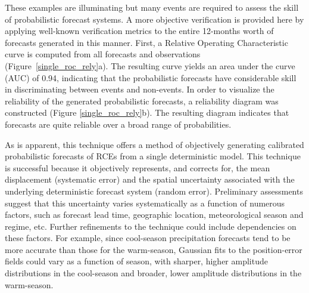 These examples are illuminating but many events are required to assess the skill of probabilistic forecast systems.
A more objective verification is provided here by applying well-known verification metrics to the entire 12-months worth of forecasts generated in this manner.
First, a Relative Operating Characteristic curve \citep{Mason1982} is computed from all forecasts and observations \mbox{(Figure \ref{single_roc_rely}a)}.
The resulting curve yields an area under the curve (AUC) of 0.94, indicating that the probabilistic forecasts have considerable skill in discriminating between events and non-events.
In order to visualize the reliability of the generated probabilistic forecasts, a reliability diagram was constructed (Figure \mbox{\ref{single_roc_rely}b)}.
The resulting diagram indicates that forecasts are quite reliable over a broad range of probabilities.


As is apparent, this technique offers a method of objectively generating calibrated probabilistic forecasts of RCEs from a single deterministic model.
This technique is successful because it objectively represents, and corrects for, the mean displacement (systematic error) and the spatial uncertainty associated with the underlying deterministic forecast system (random error).
Preliminary assessments suggest that this uncertainty varies systematically as a function of numerous factors, such as forecast lead time, geographic location, meteorological season and regime, etc.
Further refinements to the technique could include dependencies on these factors.
For example, since cool-season precipitation forecasts tend to be more accurate than those for the warm-season, Gaussian fits to the position-error fields could vary as a function of season, with sharper, higher amplitude distributions in the cool-season and broader, lower amplitude distributions in the warm-season.


